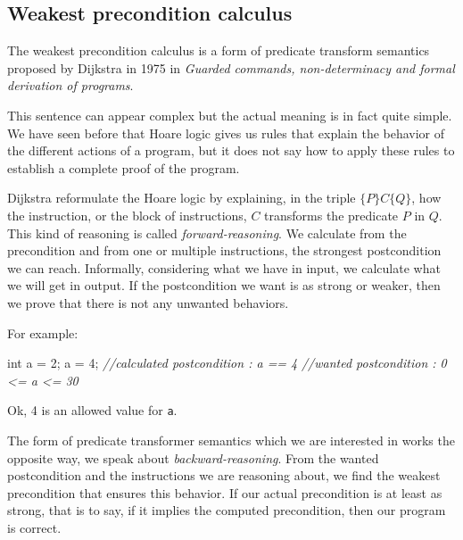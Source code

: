 \documentclass[12pt,francais,]{scrbook}
\newenvironment{Shaded}{}{}
\newcommand{\DataTypeTok}[1]{\textcolor[rgb]{0.56,0.13,0.00}{{#1}}}
\newcommand{\DecValTok}[1]{\textcolor[rgb]{0.25,0.63,0.44}{{#1}}}
\newcommand{\CommentTok}[1]{\textcolor[rgb]{0.38,0.63,0.69}{\textit{{#1}}}}
\newcommand{\NormalTok}[1]{{#1}}
\begin{document}
\subsection{Weakest precondition
calculus}\label{weakest-precondition-calculus}

The weakest precondition calculus is a form of predicate transform
semantics proposed by Dijkstra in 1975 in \emph{Guarded commands,
non-determinacy and formal derivation of programs}.

This sentence can appear complex but the actual meaning is in fact quite
simple. We have seen before that Hoare logic gives us rules that explain
the behavior of the different actions of a program, but it does not say
how to apply these rules to establish a complete proof of the program.

Dijkstra reformulate the Hoare logic by explaining, in the triple
\(\{P\}C\{Q\}\), how the instruction, or the block of instructions,
\(C\) transforms the predicate \(P\) in \(Q\). This kind of reasoning is
called \emph{forward-reasoning}. We calculate from the precondition and
from one or multiple instructions, the strongest postcondition we can
reach. Informally, considering what we have in input, we calculate what
we will get in output. If the postcondition we want is as strong or
weaker, then we prove that there is not any unwanted behaviors.

For example:

\begin{footnotesize}\begin{Shaded}
\begin{Highlighting}[]
\DataTypeTok{int} \NormalTok{a = }\DecValTok{2}\NormalTok{;}
\NormalTok{a = }\DecValTok{4}\NormalTok{;}
\CommentTok{//calculated postcondition : a == 4}
\CommentTok{//wanted postcondition     : 0 <= a <= 30}
\end{Highlighting}
\end{Shaded}\end{footnotesize}

Ok, 4 is an allowed value for \texttt{a}.

The form of predicate transformer semantics which we are interested in
works the opposite way, we speak about \emph{backward-reasoning}. From
the wanted postcondition and the instructions we are reasoning about, we
find the weakest precondition that ensures this behavior. If our actual
precondition is at least as strong, that is to say, if it implies the
computed precondition, then our program is correct.
\end{document}
